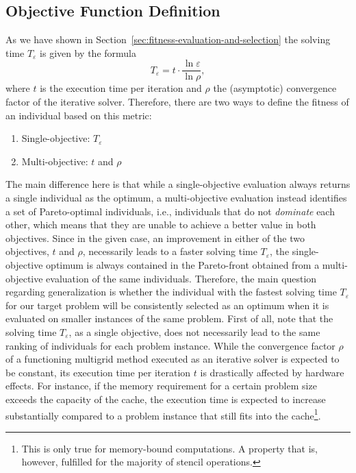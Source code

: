 \subsection{Objective Function Definition}
\label{sec:generalization:objective-function-definition}
As we have shown in Section~\ref{sec:fitness-evaluation-and-selection} the solving time $T_{\varepsilon}$ is given by the formula
\begin{equation*}
	T_{\varepsilon} = t \cdot \frac{\ln \varepsilon}{\ln \rho},
\end{equation*}
where $t$ is the execution time per iteration and $\rho$ the (asymptotic) convergence factor of the iterative solver.
Therefore, there are two ways to define the fitness of an individual based on this metric:
\begin{enumerate}
	\item Single-objective: $T_{\varepsilon}$
	\item Multi-objective:  $t$ and $\rho$
\end{enumerate}
The main difference here is that while a single-objective evaluation always returns a single individual as the optimum, a multi-objective evaluation instead identifies a set of Pareto-optimal individuals, i.e., individuals that do not \emph{dominate} each other, which means that they are unable to achieve a better value in both objectives.
Since in the given case, an improvement in either of the two objectives, $t$ and $\rho$, necessarily leads to a faster solving time $T_{\varepsilon}$, the single-objective optimum is always contained in the Pareto-front obtained from a multi-objective evaluation of the same individuals.
Therefore, the main question regarding generalization is whether the individual with the fastest solving time $T_{\varepsilon}$ for our target problem will be consistently selected as an optimum when it is evaluated on smaller instances of the same problem.
First of all, note that the solving time $T_{\varepsilon}$, as a single objective, does not necessarily lead to the same ranking of individuals for each problem instance.
While the convergence factor $\rho$ of a functioning multigrid method executed as an iterative solver is expected to be constant, its execution time per iteration $t$ is drastically affected by hardware effects.
For instance, if the memory requirement for a certain problem size exceeds the capacity of the cache, the execution time is expected to increase substantially compared to a problem instance that still fits into the cache\footnote{This is only true for memory-bound computations. A property that is, however, fulfilled for the majority of stencil operations.}.
